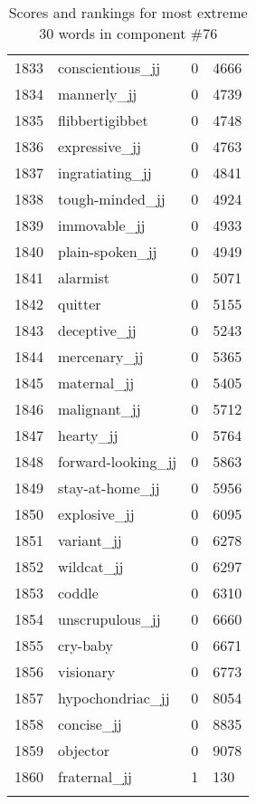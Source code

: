 \begin{longtable}[!htbp]{| rlr@{.}l |}
    1833 & conscientious\_jj & 0 & 4666 \\
    1834 & mannerly\_jj & 0 & 4739 \\
    1835 & flibbertigibbet & 0 & 4748 \\
    1836 & expressive\_jj & 0 & 4763 \\
    1837 & ingratiating\_jj & 0 & 4841 \\
    1838 & tough-minded\_jj & 0 & 4924 \\
    1839 & immovable\_jj & 0 & 4933 \\
    1840 & plain-spoken\_jj & 0 & 4949 \\
    1841 & alarmist & 0 & 5071 \\
    1842 & quitter & 0 & 5155 \\
    1843 & deceptive\_jj & 0 & 5243 \\
    1844 & mercenary\_jj & 0 & 5365 \\
    1845 & maternal\_jj & 0 & 5405 \\
    1846 & malignant\_jj & 0 & 5712 \\
    1847 & hearty\_jj & 0 & 5764 \\
    1848 & forward-looking\_jj & 0 & 5863 \\
    1849 & stay-at-home\_jj & 0 & 5956 \\
    1850 & explosive\_jj & 0 & 6095 \\
    1851 & variant\_jj & 0 & 6278 \\
    1852 & wildcat\_jj & 0 & 6297 \\
    1853 & coddle & 0 & 6310 \\
    1854 & unscrupulous\_jj & 0 & 6660 \\
    1855 & cry-baby & 0 & 6671 \\
    1856 & visionary & 0 & 6773 \\
    1857 & hypochondriac\_jj & 0 & 8054 \\
    1858 & concise\_jj & 0 & 8835 \\
    1859 & objector & 0 & 9078 \\
    1860 & fraternal\_jj & 1 & 130 \\
    \hline
    \caption{Scores and rankings for most extreme 30 words in component \#76} \\
\end{longtable}
